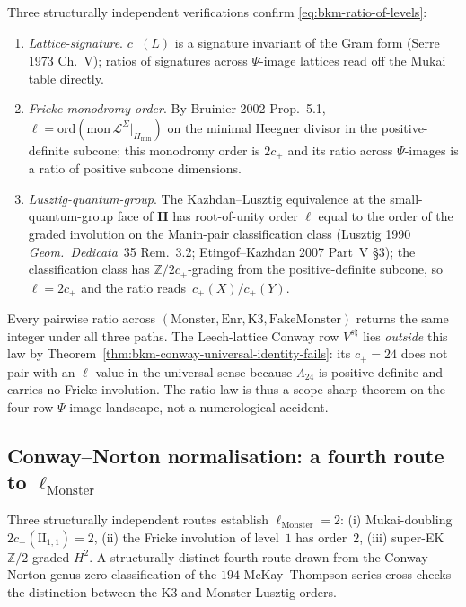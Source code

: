 \begin{remark}
\label{rem:bkm-ratio-of-levels-triangulation}
Three structurally independent verifications confirm
\eqref{eq:bkm-ratio-of-levels}:
\begin{enumerate}[label=\textup{(\roman*)}]
\item \emph{Lattice-signature}. $c_+(L)$ is a signature invariant of
 the Gram form (Serre 1973 Ch.~V); ratios of signatures across
 $\Psi$-image lattices read off the Mukai table directly.
\item \emph{Fricke-monodromy order}. By Bruinier 2002 Prop.~5.1,
 $\ell = \mathrm{ord}(\mathrm{mon}\,\mathcal L^\Sigma|_{H_{\min}})$
 on the minimal Heegner divisor in the positive-definite subcone;
 this monodromy order is $2c_+$ and its ratio across $\Psi$-images
 is a ratio of positive subcone dimensions.
\item \emph{Lusztig-quantum-group}. The Kazhdan--Lusztig equivalence at
 the small-quantum-group face of $\mathbf H$ has root-of-unity order
 $\ell$ equal to the order of the graded involution on the
 Manin-pair classification class (Lusztig 1990 \emph{Geom.\ Dedicata}~35
 Rem.~3.2; Etingof--Kazhdan 2007 Part~V \S3); the classification
 class has $\mathbb Z/2c_+$-grading from the positive-definite
 subcone, so $\ell = 2c_+$ and the ratio reads~$c_+(X)/c_+(Y)$.
\end{enumerate}
Every pairwise ratio across $(\mathrm{Monster},\mathrm{Enr},
\mathrm{K3},\mathrm{FakeMonster})$ returns the same integer under
all three paths. The Leech-lattice Conway row
$V^{s\natural}$ lies \emph{outside} this law by
Theorem~\ref{thm:bkm-conway-universal-identity-fails}: its $c_+ = 24$
does not pair with an $\ell$-value in the universal sense because
$\Lambda_{24}$ is positive-definite and carries no Fricke involution.
The ratio law is thus a scope-sharp theorem on the four-row
$\Psi$-image landscape, not a numerological accident.
\end{remark}

\subsection{Conway--Norton normalisation: a fourth route to \texorpdfstring{$\ell_{\mathrm{Monster}}$}{l-Monster}}
\label{subsec:k3ebkm-witten-conway-norton}

Three structurally independent routes establish $\ell_{\mathrm{Monster}} = 2$:
(i) Mukai-doubling $2c_+(\mathrm{II}_{1,1}) = 2$,
(ii) the Fricke involution of level~$1$ has order~$2$,
(iii) super-EK $\mathbb{Z}/2$-graded $H^2$. A structurally distinct fourth route
drawn from the Conway--Norton genus-zero classification of the $194$
McKay--Thompson series cross-checks the distinction between the K3 and Monster
Lusztig orders.

